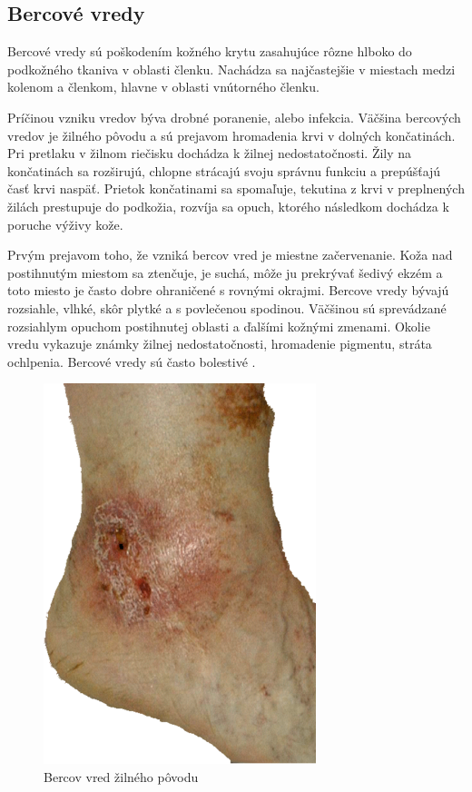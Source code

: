 \subsection{Bercové vredy}
Bercové vredy sú poškodením kožného krytu zasahujúce rôzne hlboko do podkožného tkaniva v oblasti členku. Nachádza sa najčastejšie v miestach medzi kolenom a členkom, hlavne v oblasti vnútorného členku.

Príčinou vzniku vredov býva drobné poranenie, alebo infekcia. Väčšina bercových vredov je žilného pôvodu a sú prejavom hromadenia krvi v dolných končatinách. Pri pretlaku v žilnom riečisku dochádza k žilnej nedostatočnosti. Žily na končatinách sa rozširujú, chlopne strácajú svoju správnu funkciu a prepúšťajú časť krvi naspäť. Prietok končatinami sa spomaľuje, tekutina z krvi v preplnených žilách prestupuje do podkožia, rozvíja sa opuch, ktorého následkom dochádza k poruche výživy kože. 

Prvým prejavom toho, že vzniká bercov vred je miestne začervenanie. Koža nad postihnutým miestom sa ztenčuje, je suchá, môže ju prekrývať šedivý ekzém a toto miesto je často dobre ohraničené s rovnými okrajmi. Bercove vredy bývajú rozsiahle, vlhké, skôr plytké a s povlečenou spodinou. Väčšinou sú sprevádzané rozsiahlym opuchom postihnutej oblasti a ďalšími kožnými zmenami. Okolie vredu vykazuje známky žilnej nedostatočnosti, hromadenie pigmentu, stráta ochlpenia. Bercové vredy sú často bolestivé \cite{pcCdSrbbhhlr5YcQ, Pokorna2012}.
\begin{figure}[h]
  \centering
  \includegraphics[scale=0.50]{fig/bercov-vred.png}
  \caption{Bercov vred žilného pôvodu \cite{BsyXZC783dJbfdc7}}
  \label{fig:bercov-vred}
\end{figure}

